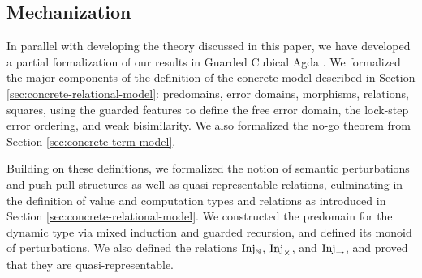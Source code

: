\subsection{Mechanization}\label{sec:mechanization}
In parallel with developing the theory discussed in this paper, we have
developed a partial formalization of our results in Guarded Cubical Agda
\cite{veltri-vezzosi2020}.
%
We formalized the major components of the definition of the concrete model
described in Section \ref{sec:concrete-relational-model}: predomains, error
domains, morphisms, relations, squares, using the guarded
features to define the free error domain, the lock-step error ordering, and weak
bisimilarity. We also formalized the no-go theorem from Section
\ref{sec:concrete-term-model}.

Building on these definitions, we formalized the notion of semantic
perturbations and push-pull structures as well as quasi-representable relations,
culminating in the definition of value and computation types and relations as
introduced in Section \ref{sec:concrete-relational-model}.
%
%
We constructed the predomain for the dynamic type via mixed induction and
guarded recursion, and defined its monoid of perturbations. We also defined the
relations $\text{Inj}_\mathbb{N}$, $\text{Inj}_\times$, and $\text{Inj}_\to$, and proved that they are
quasi-representable.




